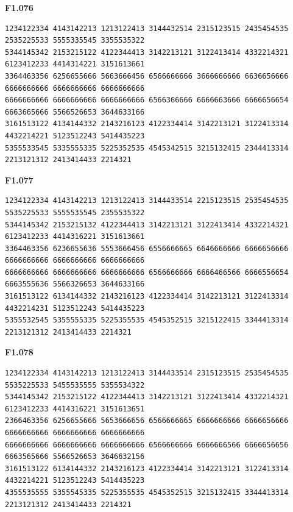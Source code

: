 \noindent\begin{minipage}{\linewidth}\textbf{F1.076}
\begin{lstlisting}
1234122334 4143142213 1213122413 3144432514 2315123515 2435454535 2535225533 5555335545 3355535322
5344145342 2153215122 4122344413 3142213121 3122413414 4332214321 6123412233 4414314221 3151613661
3364463356 6256655666 5663666456 6566666666 3666666666 6636656666 6666666666 6666666666 6666666666
6666666666 6666666666 6666666666 6566366666 6666663666 6666656654 6663665666 5566526653 3644633166
3161513122 4134144332 2143216123 4122334414 3142213121 3122413314 4432214221 5123512243 5414435223
5355533545 5335555335 5225352535 4545342515 3215132415 2344413314 2213121312 2413414433 2214321
\end{lstlisting}
\end{minipage}\par\smallskip

\noindent\begin{minipage}{\linewidth}\textbf{F1.077}
\begin{lstlisting}
1234122334 4143142213 1213122413 3144433514 2215123515 2535454535 5535225533 5555535545 2355535322
5344145342 2153215132 4122344413 3142213121 3122413414 4332214321 6123412233 4414316221 3151613661
3364463356 6236655636 5553666456 6556666665 6646666666 6666656666 6666666666 6666666666 6666666666
6666666666 6666666666 6666666666 6566666666 6666466566 6666556654 6663555636 5566326653 3644633166
3161513122 6134144332 2143216123 4122334414 3142213121 3122413314 4432214231 5123512243 5414435223
5355532545 5355555335 5225355535 4545352515 3215122415 3344413314 2213121312 2413414433 2214321
\end{lstlisting}
\end{minipage}\par\smallskip

\noindent\begin{minipage}{\linewidth}\textbf{F1.078}
\begin{lstlisting}
1234122334 4143142213 1213122413 3144433514 2315123515 2535454535 5535225533 5455535555 5355534322
5344145342 2153215122 4122344413 3142213121 3122413414 4332214321 6123412233 4414316221 3151613651
2366463356 6256655666 5653666656 6566666665 6666666666 6666656666 6666666666 6666666666 6666666666
6666666666 6666666666 6666666666 6566666666 6666666566 6666656656 6663565666 5566526653 3646632156
3161513122 6134144332 2143216123 4122334414 3142213121 3122413314 4432214221 5123512243 5414435223
4355535555 5355545335 5225355535 4545352515 3215132415 3344413314 2213121312 2413414433 2214321
\end{lstlisting}
\end{minipage}\par\smallskip

